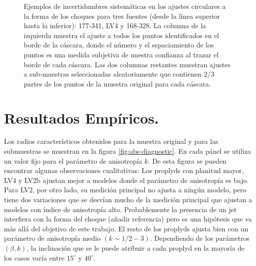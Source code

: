 \begin{figure}
\begin{tabular}{@{}c@{}c@{}c@{}}
\end{tabular}
\caption{Ejemplos de incertidumbres sistemáticas en los ajustes circulares a la forma de los choques para tres fuentes (desde la línea superior hasta la inferior): 177-341, LV4 y 168-328. La columna de la izquierda muestra el ajuste a todos los puntos identificados en el borde de la cáscara, donde el número y el espaciamiento de los puntos es una medida subjetiva de nuestra confianza al trazar el borde de cada cáscara. Las dos columnas restantes muestran ajustes a sub-muestras seleccionadas aleatoriamente que contienen 2/3 partes de los puntos de la muestra original para cada cáscara.}
\label{fig:char-radii-obs}
\end{figure}

\section{Resultados Empíricos.}

Los radios característicos obtenidos para la muestra original y para las submuestras se muestran en la figura \ref{fig:obs-diagnostic}. En cada pánel se utiliza un valor fijo para el parámetro de anisotropía $k$. De esta figura se pueden encontrar algunas observaciones cualitativas: Los proplyds con planitud mayor, LV4 y LV2b ajustan mejor a modelos donde el parámetro de anisotropía es bajo. Para LV2, por otro lado, su medición principal no ajusta a ningún modelo, pero tiene dos variaciones que se desvían mucho de la medición principal que ajustan a modelos con índice de anisotropía alto. Probablemente la presencia de un jet interfiera con la forma del choque (añadir referencia) pero es una hipótesis que va más allá del objetivo de este trabajo. El resto de los proplyds ajusta bien con un parámetro de anisotropía medio $(k\sim 1/2 - 3)$. Dependiendo de los parámetros $(\beta, k)$, la inclinación que se le puede atribuir a cada proplyd en la mayoría de los casos varía entre $15^\circ$ y $40^\circ$. 

